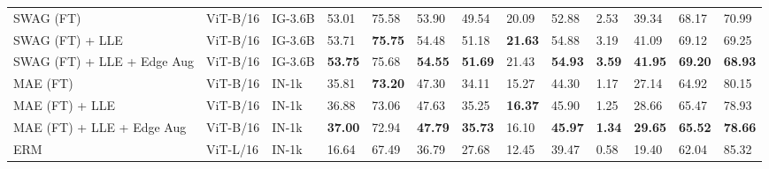 \documentclass[10pt,twocolumn,letterpaper]{article}
\begin{document}
\begin{table}[t]
\begin{adjustbox}{width=\linewidth}
\begin{tabular}{@{}lllllllllllll@{}}
SWAG (FT)                  & ViT-B/16  & IG-3.6B                                 & 53.01          & 75.58                      & 53.90                                                & 49.54          & 20.09          & 52.88          & 2.53           & 39.34                            & 68.17                          & 70.99          \\
SWAG (FT) + LLE            & ViT-B/16  & IG-3.6B                                 & 53.71          & \textbf{75.75}             & 54.48                                                & 51.18          & \textbf{21.63} & 54.88          & 3.19           & 41.09                            & 69.12                          & 69.25          \\
SWAG (FT) + LLE + Edge Aug & ViT-B/16  & IG-3.6B                                 & \textbf{53.75} & 75.68                      & \textbf{54.55}                                       & \textbf{51.69} & 21.43          & \textbf{54.93} & \textbf{3.59}  & \textbf{41.95}                   & \textbf{69.20}                 & \textbf{68.93} \\ \cmidrule(l){4-13}
MAE (FT)                   & ViT-B/16  & IN-1k                                   & 35.81          & \textbf{73.20}             & 47.30                                                & 34.11          & 15.27          & 44.30          & 1.17           & 27.14                            & 64.92                          & 80.15          \\
MAE (FT) + LLE             & ViT-B/16  & IN-1k                                   & 36.88          & 73.06                      & 47.63                                                & 35.25          & \textbf{16.37} & 45.90          & 1.25           & 28.66                            & 65.47                          & 78.93          \\
MAE (FT) + LLE + Edge Aug  & ViT-B/16  & IN-1k                                   & \textbf{37.00} & 72.94                      & \textbf{47.79}                                       & \textbf{35.73} & 16.10          & \textbf{45.97} & \textbf{1.34}  & \textbf{29.65}                   & \textbf{65.52}                 & \textbf{78.66} \\ \midrule
ERM                        & ViT-L/16  & IN-1k                                   & 16.64          & 67.49                      & 36.79                                                & 27.68          & 12.45          & 39.47          & 0.58           & 19.40                            & 62.04                          & 85.32          \\

\end{tabular}
\end{adjustbox}
\end{table}
\end{document}
